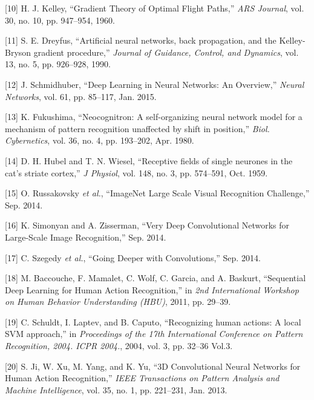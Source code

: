 \documentclass[A4paper,draft]{scrreprt}
\begin{document}
\hypertarget{ref-kelley1960_GradientTheoryOptimal}{}
{[}10{]} H. J. Kelley, ``Gradient Theory of Optimal Flight Paths,''
\emph{ARS Journal}, vol. 30, no. 10, pp. 947--954, 1960.

\hypertarget{ref-dreyfus1990_Artificialneuralnetworks}{}
{[}11{]} S. E. Dreyfus, ``Artificial neural networks, back propagation,
and the Kelley-Bryson gradient procedure,'' \emph{Journal of Guidance,
Control, and Dynamics}, vol. 13, no. 5, pp. 926--928, 1990.

\hypertarget{ref-schmidhuber2015_DeepLearningNeural}{}
{[}12{]} J. Schmidhuber, ``Deep Learning in Neural Networks: An
Overview,'' \emph{Neural Networks}, vol. 61, pp. 85--117, Jan. 2015.

\hypertarget{ref-fukushima1980_Neocognitronselforganizingneural}{}
{[}13{]} K. Fukushima, ``Neocognitron: A self-organizing neural network
model for a mechanism of pattern recognition unaffected by shift in
position,'' \emph{Biol. Cybernetics}, vol. 36, no. 4, pp. 193--202, Apr.
1980.

\hypertarget{ref-hubel1959_Receptivefieldssingle}{}
{[}14{]} D. H. Hubel and T. N. Wiesel, ``Receptive fields of single
neurones in the cat's striate cortex,'' \emph{J Physiol}, vol. 148, no.
3, pp. 574--591, Oct. 1959.

\hypertarget{ref-russakovsky2014_ImageNetLargeScale}{}
{[}15{]} O. Russakovsky \emph{et al.}, ``ImageNet Large Scale Visual
Recognition Challenge,'' Sep. 2014.

\hypertarget{ref-simonyan2014_VeryDeepConvolutional}{}
{[}16{]} K. Simonyan and A. Zisserman, ``Very Deep Convolutional
Networks for Large-Scale Image Recognition,'' Sep. 2014.

\hypertarget{ref-szegedy2014_GoingDeeperConvolutions}{}
{[}17{]} C. Szegedy \emph{et al.}, ``Going Deeper with Convolutions,''
Sep. 2014.

\hypertarget{ref-baccouche2011_SequentialDeepLearning}{}
{[}18{]} M. Baccouche, F. Mamalet, C. Wolf, C. Garcia, and A. Baskurt,
``Sequential Deep Learning for Human Action Recognition,'' in \emph{2nd
International Workshop on Human Behavior Understanding (HBU)}, 2011, pp.
29--39.

\hypertarget{ref-schuldt2004_Recognizinghumanactions}{}
{[}19{]} C. Schuldt, I. Laptev, and B. Caputo, ``Recognizing human
actions: A local SVM approach,'' in \emph{Proceedings of the 17th
International Conference on Pattern Recognition, 2004. ICPR 2004.},
2004, vol. 3, pp. 32--36 Vol.3.

\hypertarget{ref-ji2013_3DConvolutionalNeural}{}
{[}20{]} S. Ji, W. Xu, M. Yang, and K. Yu, ``3D Convolutional Neural
Networks for Human Action Recognition,'' \emph{IEEE Transactions on
Pattern Analysis and Machine Intelligence}, vol. 35, no. 1, pp.
221--231, Jan. 2013.
\end{document}
